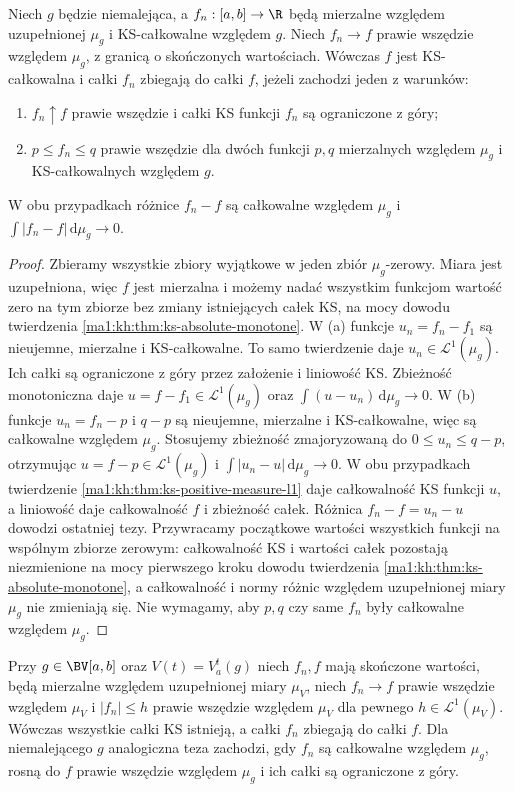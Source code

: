 \begin{wniosek}\label{ma1:kh:cor:ks-order-limits-monotone}
Niech $g$ będzie niemalejąca, a $f_n:[a,b]\to\R$ będą mierzalne względem uzupełnionej $\mu_g$ i KS-całkowalne względem $g$. Niech $f_n\to f$ prawie wszędzie względem $\mu_g$, z granicą o skończonych wartościach. Wówczas $f$ jest KS-całkowalna i całki $f_n$ zbiegają do całki $f$, jeżeli zachodzi jeden z warunków:
\begin{enumerate}[label=(\alph*)]
\item $f_n\uparrow f$ prawie wszędzie i całki KS funkcji $f_n$ są ograniczone z góry;
\item $p\le f_n\le q$ prawie wszędzie dla dwóch funkcji $p,q$ mierzalnych względem $\mu_g$ i KS-całkowalnych względem $g$.
\end{enumerate}
W obu przypadkach różnice $f_n-f$ są całkowalne względem $\mu_g$ i $\int|f_n-f|\,\mathrm d\mu_g\to0$.
\end{wniosek}
\begin{proof}
Zbieramy wszystkie zbiory wyjątkowe w jeden zbiór $\mu_g$-zerowy. Miara jest uzupełniona, więc $f$ jest mierzalna i możemy nadać wszystkim funkcjom wartość zero na tym zbiorze bez zmiany istniejących całek KS, na mocy dowodu twierdzenia \ref{ma1:kh:thm:ks-absolute-monotone}. W (a) funkcje $u_n=f_n-f_1$ są nieujemne, mierzalne i KS-całkowalne. To samo twierdzenie daje $u_n\in\mathcal L^1(\mu_g)$. Ich całki są ograniczone z góry przez założenie i liniowość KS. Zbieżność monotoniczna daje $u=f-f_1\in\mathcal L^1(\mu_g)$ oraz $\int(u-u_n)\,\mathrm d\mu_g\to0$. W (b) funkcje $u_n=f_n-p$ i $q-p$ są nieujemne, mierzalne i KS-całkowalne, więc są całkowalne względem $\mu_g$. Stosujemy zbieżność zmajoryzowaną do $0\le u_n\le q-p$, otrzymując $u=f-p\in\mathcal L^1(\mu_g)$ i $\int|u_n-u|\,\mathrm d\mu_g\to0$. W obu przypadkach twierdzenie \ref{ma1:kh:thm:ks-positive-measure-l1} daje całkowalność KS funkcji $u$, a liniowość daje całkowalność $f$ i zbieżność całek. Różnica $f_n-f=u_n-u$ dowodzi ostatniej tezy. Przywracamy początkowe wartości wszystkich funkcji na wspólnym zbiorze zerowym: całkowalność KS i wartości całek pozostają niezmienione na mocy pierwszego kroku dowodu twierdzenia \ref{ma1:kh:thm:ks-absolute-monotone}, a całkowalność i normy różnic względem uzupełnionej miary $\mu_g$ nie zmieniają się. Nie wymagamy, aby $p,q$ czy same $f_n$ były całkowalne względem $\mu_g$.
\end{proof}
\begin{wniosek}\label{ma1:kh:cor:ks-measure-limits}
Przy $g\in\BV[a,b]$ oraz $V(t)=V_a^t(g)$ niech $f_n,f$ mają skończone wartości, będą mierzalne względem uzupełnionej miary $\mu_V$, niech $f_n\to f$ prawie wszędzie względem $\mu_V$ i $|f_n|\le h$ prawie wszędzie względem $\mu_V$ dla pewnego $h\in\mathcal L^1(\mu_V)$. Wówczas wszystkie całki KS istnieją, a całki $f_n$ zbiegają do całki $f$. Dla niemalejącego $g$ analogiczna teza zachodzi, gdy $f_n$ są całkowalne względem $\mu_g$, rosną do $f$ prawie wszędzie względem $\mu_g$ i ich całki są ograniczone z góry.
\end{wniosek}
